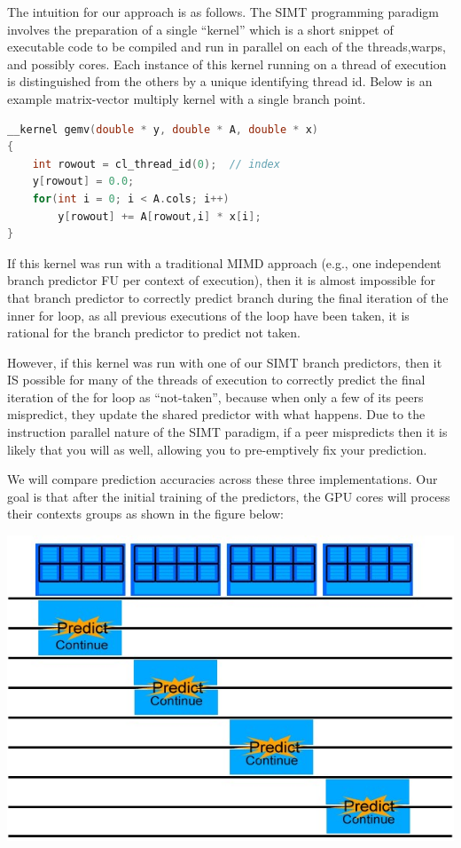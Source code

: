\documentclass[conference]{IEEEtran}
\begin{document}
The intuition for our approach is as follows.  The SIMT programming paradigm involves the preparation of a single ``kernel'' which is a short
snippet of executable code to be compiled and run in parallel on each of the threads,warps, and possibly cores.  Each instance of this kernel
running on a thread of execution is distinguished from the others by a unique identifying thread id.  Below is an example matrix-vector multiply
kernel with a single branch point.

\begin{lstlisting}[language=C,basicstyle=\footnotesize,frame=single,tabsize=4,title=GemV.cl]
__kernel gemv(double * y, double * A, double * x)
{
    int rowout = cl_thread_id(0);  // index
    y[rowout] = 0.0;
    for(int i = 0; i < A.cols; i++)
        y[rowout] += A[rowout,i] * x[i];
}
\end{lstlisting}

If this kernel was run with a traditional MIMD approach (e.g., one independent branch predictor FU per context of execution), then it is almost
impossible for that branch predictor to correctly predict branch during the final iteration of the inner for loop, as all previous executions of the loop
have been taken, it is rational for the branch predictor to predict not taken.

However, if this kernel was run with one of our SIMT branch predictors, then it IS possible for many of the threads of execution to correctly predict the final iteration
of the for loop as ``not-taken'', because when only a few of its peers mispredict, they update the shared predictor with what happens.  Due to the instruction parallel nature of the 
SIMT paradigm, if a peer mispredicts then it is likely that you will as well, allowing you to pre-emptively fix your prediction.

We will compare prediction accuracies across these three implementations.  Our goal is that after the initial training of the predictors, the GPU cores will process their contexts groups as shown in the figure below:

\begin{center}
	\includegraphics[width=.45\textwidth]{GPU-predict-context.jpg}
\end{center}
\end{document}
